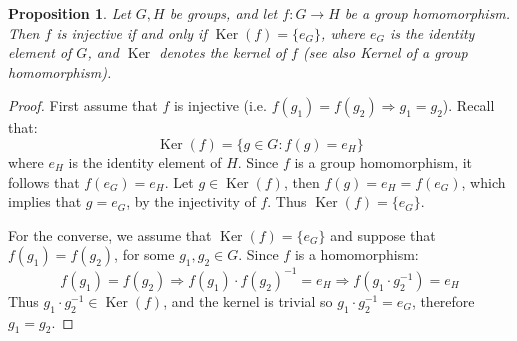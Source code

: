 \documentclass[12pt]{article}
\newtheorem*{prop}{Proposition}
\newcommand{\Ker}{\operatorname{Ker}}
\begin{document}
\begin{prop}
Let $G,H$ be groups, and let $f \colon G \to H$ be a group homomorphism. Then $f$ is injective if and only if $\Ker(f)=\{e_G\}$, where $e_G$ is the identity element of $G$, and $\Ker$ denotes the kernel of $f$ (see also Kernel of a group homomorphism).  
\end{prop}
\begin{proof}

First assume that $f$ is injective (i.e. $f(g_1)=f(g_2) \Rightarrow g_1=g_2$). Recall that:
$$\Ker(f)=\{ g\in G : f(g)=e_H \}$$
where $e_H$ is the identity element of $H$. Since $f$ is a group homomorphism, it follows that $f(e_G)=e_H$. Let $g\in \Ker(f)$, then $f(g)=e_H=f(e_G)$, which implies that $g=e_G$, by the injectivity of $f$. Thus $\Ker(f)=\{ e_G \}$.

For the converse, we assume that $\Ker(f)=\{ e_G \}$ and suppose that $f(g_1)=f(g_2)$, for some $g_1,g_2 \in G$. Since $f$ is a homomorphism:
$$f(g_1)=f(g_2) \Rightarrow f(g_1)\cdot f(g_2)^{-1}=e_H \Rightarrow f(g_1\cdot g_2^{-1})=e_H$$
Thus $g_1\cdot g_2^{-1} \in \Ker(f)$, and the kernel is trivial so $g_1\cdot g_2^{-1}=e_G$, therefore $g_1=g_2$.
\end{proof}
\end{document}
